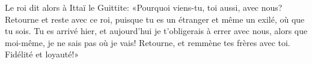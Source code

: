 Le roi dit alors à Ittaï le Guittite:
	«Pourquoi viens-tu, toi aussi, avec nous?
	Retourne et reste avec ce roi,
	puisque tu es un étranger et même un exilé, où que tu sois.
Tu es arrivé hier, et aujourd’hui je t’obligerais à errer avec nous,
	alors que moi-même, je ne sais pas où je vais!
Retourne, et remmène tes frères avec toi.
	Fidélité et loyauté!»
